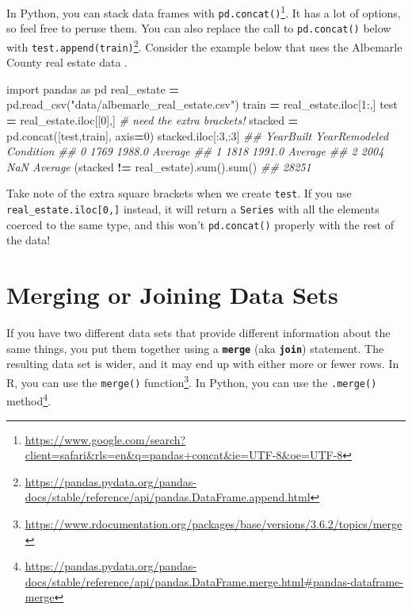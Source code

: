 \documentclass[
  12pt,
  krantz2]{krantz}
\makeatletter
\newenvironment{Shaded}{\begin{snugshade}}{\end{snugshade}}
\newcommand{\BuiltInTok}[1]{#1}
\newcommand{\CommentTok}[1]{\textcolor[rgb]{0.37,0.37,0.37}{\textit{#1}}}
\newcommand{\DecValTok}[1]{\textcolor[rgb]{0.06,0.06,0.06}{#1}}
\newcommand{\ImportTok}[1]{#1}
\newcommand{\NormalTok}[1]{#1}
\newcommand{\OperatorTok}[1]{\textcolor[rgb]{0.43,0.43,0.43}{\textbf{#1}}}
\newcommand{\StringTok}[1]{\textcolor[rgb]{0.5,0.5,0.5}{#1}}
\renewcommand{\href}[2]{#2\footnote{\url{#1}}}
\newenvironment{kframe}{%
\medskip{}
\setlength{\fboxsep}{.8em}
 \def\at@end@of@kframe{}%
 \ifinner\ifhmode%
  \def\at@end@of@kframe{\end{minipage}}%
  \begin{minipage}{\columnwidth}%
 \fi\fi%
 \def\FrameCommand##1{\hskip\@totalleftmargin \hskip-\fboxsep
 \colorbox{shadecolor}{##1}\hskip-\fboxsep
     \hskip-\linewidth \hskip-\@totalleftmargin \hskip\columnwidth}%
 \MakeFramed {\advance\hsize-\width
   \@totalleftmargin\z@ \linewidth\hsize
   \@setminipage}}%
 {\par\unskip\endMakeFramed%
 \at@end@of@kframe}
\renewenvironment{Shaded}{\begin{kframe}}{\end{kframe}}
\makeatother
\begin{document}
In Python, you can stack data frames with \href{https://www.google.com/search?client=safari\&rls=en\&q=pandas+concat\&ie=UTF-8\&oe=UTF-8}{\texttt{pd.concat()}}. It has a lot of options, so feel free to peruse them. You can also replace the call to \texttt{pd.concat()} below with \href{https://pandas.pydata.org/pandas-docs/stable/reference/api/pandas.DataFrame.append.html}{\texttt{test.append(train)}}. Consider the example below that uses the Albemarle County real estate data \citep{albemarle_county_gis_web} \citep{clay_ford}.

\begin{Shaded}
\begin{Highlighting}[]
\ImportTok{import}\NormalTok{ pandas }\ImportTok{as}\NormalTok{ pd}
\NormalTok{real\_estate }\OperatorTok{=}\NormalTok{ pd.read\_csv(}\StringTok{"data/albemarle\_real\_estate.csv"}\NormalTok{)}
\NormalTok{train }\OperatorTok{=}\NormalTok{ real\_estate.iloc[}\DecValTok{1}\NormalTok{:,]}
\NormalTok{test }\OperatorTok{=}\NormalTok{ real\_estate.iloc[[}\DecValTok{0}\NormalTok{],] }\CommentTok{\# need the extra brackets!}
\NormalTok{stacked }\OperatorTok{=}\NormalTok{ pd.concat([test,train], axis}\OperatorTok{=}\DecValTok{0}\NormalTok{)}
\NormalTok{stacked.iloc[:}\DecValTok{3}\NormalTok{,:}\DecValTok{3}\NormalTok{]}
\CommentTok{\#\#    YearBuilt  YearRemodeled Condition}
\CommentTok{\#\# 0       1769         1988.0   Average}
\CommentTok{\#\# 1       1818         1991.0   Average}
\CommentTok{\#\# 2       2004            NaN   Average}
\NormalTok{(stacked }\OperatorTok{!=}\NormalTok{ real\_estate).}\BuiltInTok{sum}\NormalTok{().}\BuiltInTok{sum}\NormalTok{()}
\CommentTok{\#\# 28251}
\end{Highlighting}
\end{Shaded}

Take note of the extra square brackets when we create \texttt{test}. If you use \texttt{real\_estate.iloc{[}0,{]}} instead, it will return a \texttt{Series} with all the elements coerced to the same type, and this won't \texttt{pd.concat()} properly with the rest of the data!

\hypertarget{merging-or-joining-data-sets}{%
\section{Merging or Joining Data Sets}\label{merging-or-joining-data-sets}}

If you have two different data sets that provide different information about the same things, you put them together using a \textbf{\texttt{merge}} (aka \textbf{\texttt{join}}) statement. The resulting data set is wider, and it may end up with either more or fewer rows. In R, you can use the \href{https://www.rdocumentation.org/packages/base/versions/3.6.2/topics/merge}{\texttt{merge()} function}. In Python, you can use the \href{https://pandas.pydata.org/pandas-docs/stable/reference/api/pandas.DataFrame.merge.html\#pandas-dataframe-merge}{\texttt{.merge()} method}.
\end{document}
